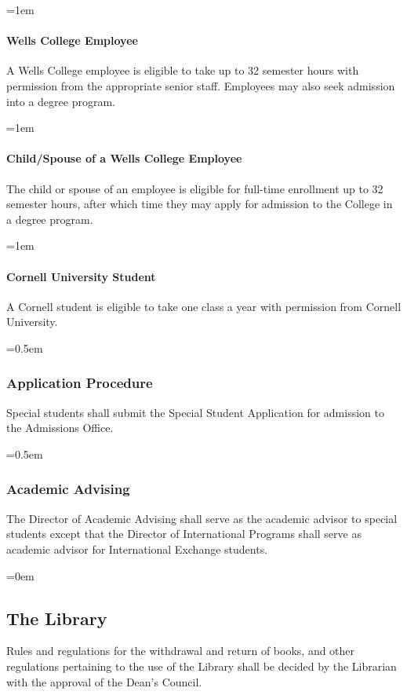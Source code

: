 \documentclass{manual}
\newcommand{\oldbreak}[1]{}
\let\oldsubsection\subsection
\renewcommand\subsection{\leftskip=0em\oldsubsection}
\let\oldsubsubsection\subsubsection
\renewcommand\subsubsection{\leftskip=0.5em\oldsubsubsection}
\let\oldparagraph\paragraph
\renewcommand\paragraph{\leftskip=1em\oldparagraph}
\begin{document}
\paragraph{Wells College Employee}\label{par:employeeClasses} A Wells College employee is eligible to take up to 32 semester hours with permission from the appropriate senior staff. Employees may also seek admission into a degree program.

\paragraph{Child/Spouse of a Wells College Employee}\label{par:spouseClasses} The child or spouse of an employee is eligible for full-time enrollment up to 32 semester hours, after which time they may apply for admission to the College in a degree program.

\paragraph{Cornell University Student} A Cornell student is eligible to take one class a year with permission from Cornell University.

\subsubsection{Application Procedure}

Special students shall submit the Special Student Application for admission to the Admissions Office.

\subsubsection{Academic Advising}

The Director of Academic Advising shall serve as the academic advisor to special students except that the Director of International Programs shall serve as academic advisor for International Exchange students. 

\oldbreak{X-2}

\subsection{The Library}

Rules and regulations for the withdrawal and return of books, and other regulations pertaining to the use of the Library shall be decided by the Librarian with the approval of the Dean's Council.
\end{document}

